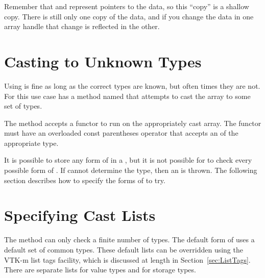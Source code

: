 \begin{commonerrors}
  Remember that  and
   represent pointers to the data, so
  this ``copy'' is a shallow copy. There is still only one copy of the
  data, and if you change the data in one array handle that change is
  reflected in the other. 
\end{commonerrors}

\section{Casting to Unknown Types}


Using  is fine as long as the correct types are
known, but often times they are not. For this use case
 has a method named
 that attempts to cast the array to some set of
types.

The  method accepts a functor to run on the
appropriately cast array. The functor must have an overloaded const
parentheses operator that accepts an  of the
appropriate type.


\begin{commonerrors}
  It is possible to store any form of  in a
  , but it is not possible for
   to check every possible form of
  . If  cannot determine
  the  type, then an
   is thrown. The following section
  describes how to specify the forms of  to try.
\end{commonerrors}

\section{Specifying Cast Lists}
\label{sec:DynamicArrayHandleSpecifyingCastLists}

The  method can only check a finite number of types.
The default form of  uses a default set of common
types. These default lists can be overridden using the VTK-m list tags
facility, which is discussed at length in Section~\ref{sec:ListTags}. There
are separate lists for value types and for storage types.


